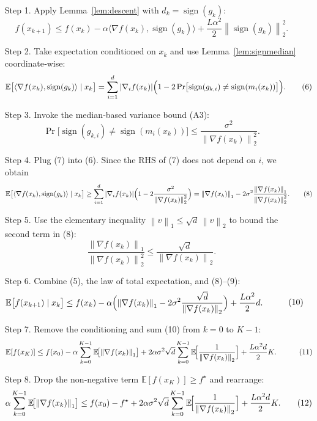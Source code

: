 \documentclass{article}
\newcommand{\E}{\mathbb{E}}
\newcommand{\sign}{\operatorname{sign}}
\newcommand{\norm}[1]{\left\|#1\right\|}
\newcommand{\ip}[2]{\langle #1,#2\rangle}
\begin{document}
\begin{enumerate}
\item[Step 1.] Apply Lemma~\ref{lem:descent} with $d_k=\sign(g_k)$:
\[
f(x_{k+1})\le f(x_k)-\alpha\ip{\nabla f(x_k)}{\sign(g_k)}+\frac{L\alpha^2}{2}\norm{\sign(g_k)}_2^2 .
\tag{5}
\]

\item[Step 2.] Take expectation conditioned on $x_k$ and use Lemma~\ref{lem:signmedian} coordinate‑wise:
\[
\E\bigl[\ip{\nabla f(x_k)}{\sign(g_k)}\mid x_k\bigr]
=
\sum_{i=1}^d |\nabla_i f(x_k)|
\Bigl(1-2\Pr\bigl[\sign(g_{k,i})\neq\sign(m_i(x_k))\bigr]\Bigr).
\tag{6}
\]

\item[Step 3.] Invoke the median‑based variance bound (A3):
\[
\Pr\bigl[\sign(g_{k,i})\neq\sign(m_i(x_k))\bigr]
\le
\frac{\sigma^2}{\norm{\nabla f(x_k)}_2^2}.
\tag{7}
\]

\item[Step 4.] Plug (7) into (6). Since the RHS of (7) does not depend on $i$, we obtain
\[
\E\bigl[\ip{\nabla f(x_k)}{\sign(g_k)}\mid x_k\bigr]
\ge
\sum_{i=1}^d |\nabla_i f(x_k)|
\Bigl(1-2\frac{\sigma^2}{\norm{\nabla f(x_k)}_2^2}\Bigr)
=
\norm{\nabla f(x_k)}_1-2\sigma^2\frac{\norm{\nabla f(x_k)}_1}{\norm{\nabla f(x_k)}_2^2}.
\tag{8}
\]

\item[Step 5.] Use the elementary inequality $\norm{v}_1\le\sqrt d\,\norm{v}_2$ to bound the second term in (8):
\[
\frac{\norm{\nabla f(x_k)}_1}{\norm{\nabla f(x_k)}_2^2}
\le
\frac{\sqrt d}{\norm{\nabla f(x_k)}_2}.
\tag{9}
\]

\item[Step 6.] Combine (5), the law of total expectation, and (8)–(9):
\[
\begin{aligned}
\E\bigl[f(x_{k+1})\mid x_k\bigr]
&\le f(x_k)-\alpha\Bigl(\norm{\nabla f(x_k)}_1
-2\sigma^2\frac{\sqrt d}{\norm{\nabla f(x_k)}_2}\Bigr)
+\frac{L\alpha^2}{2}d .
\end{aligned}
\tag{10}
\]

\item[Step 7.] Remove the conditioning and sum (10) from $k=0$ to $K-1$:
\[
\begin{aligned}
\E[f(x_K)] &\le f(x_0)-\alpha\sum_{k=0}^{K-1}\E\!\bigl[\norm{\nabla f(x_k)}_1\bigr]
+2\alpha\sigma^2\sqrt d\sum_{k=0}^{K-1}\E\!\Bigl[\frac{1}{\norm{\nabla f(x_k)}_2}\Bigr]
+\frac{L\alpha^2 d}{2}K .
\end{aligned}
\tag{11}
\]

\item[Step 8.] Drop the non‑negative term $\E[f(x_K)]\ge f^\star$ and rearrange:
\[
\alpha\sum_{k=0}^{K-1}\E\!\bigl[\norm{\nabla f(x_k)}_1\bigr]
\le f(x_0)-f^\star
+2\alpha\sigma^2\sqrt d\sum_{k=0}^{K-1}\E\!\Bigl[\frac{1}{\norm{\nabla f(x_k)}_2}\Bigr]
+\frac{L\alpha^2 d}{2}K .
\tag{12}
\]


\end{enumerate}
\end{document}

